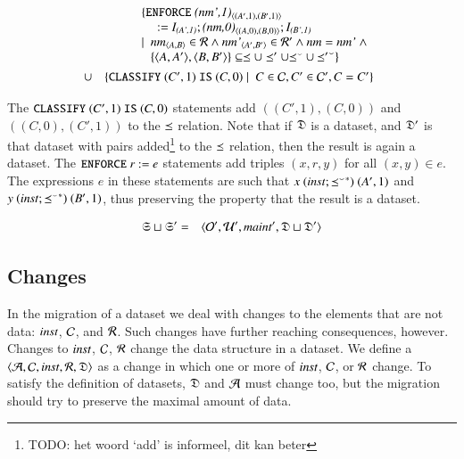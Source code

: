 \documentclass{elsarticle}
\begin{document}
\begin{definition}
   \begin{eqnarray}
      &&\begin{array}[t]{@{}l}
         \{ {\tt ENFORCE\ }\declare{(nm',1)}{(A',1)}{(B',1)}\\\quad{\tt\ :=\ }\ident{(A',1)};\declare{(nm,0)}{(A,0)}{(B,0)};\ident{(B',1)}\\
            \mid\ \begin{array}[t]{@{}l}
               \declare{nm}{A}{B}\in\rels\wedge\declare{nm'}{A'}{B'}\in\rels'\wedge\id{nm}=\id{nm'}\ \wedge\\
               \{\pair{A}{A'},\pair{B}{B'}\}\subseteq\isa\cup\isa'\cup\flip{\isa}\cup\flip{\isa'}\}
               \end{array}
           \end{array}\\
           &\cup&\begin{array}[t]{@{}l}
            \{ {\tt CLASSIFY\ }(C',1){\tt\ IS\ }(C,0)\mid\ C\in\concepts,C'\in\concepts',C=C'\}\\
           \end{array}
   \end{eqnarray}
\end{definition}

The ${\tt CLASSIFY\ }(C',1){\tt\ IS\ }(C,0)$ statements add $((C',1),(C,0))$ and  $((C,0),(C',1))$ to the $\preceq$ relation. Note that if $\mathfrak{D}$ is a dataset, and $\mathfrak{D}'$ is that dataset with pairs added\footnote{TODO: het woord `add' is informeel, dit kan beter} to the $\preceq$ relation, then the result is again a dataset.
The ${\tt ENFORCE\ }r{\tt\ :=\ }e$ statements add triples $(x,r,y)$ for all $(x,y)\in e$.
The expressions $e$ in these statements are such that $x\ (\text{\it inst\/} ; {{\preceq}^\smallsmile}^*)\ (A',1)$ and $y \ (\inst \compose \kleenestar{\flip{\isa}})\ (B',1)$, thus preserving the property that the result is a dataset.

\begin{definition}[]
   \begin{eqnarray}
      \mathfrak{S}\sqcup\mathfrak{S}'&=&\langle\mathcal{O}',\mathcal{U}',\text{\it maint\/}',\mathfrak{D}\sqcup\mathfrak{D}'\rangle
   \end{eqnarray}
\end{definition}

\subsection{Changes}
   In the migration of a dataset we deal with changes to the elements that are not data:
   $\text{\it inst\/}$, $\mathcal{C}$, and $\mathcal{R}$.
   Such changes have further reaching consequences, however.
   Changes to $\text{\it inst\/}$, $\mathcal{C}$, $\mathcal{R}$ change the data structure in a dataset.
   We define a  $\langle\mathcal{A},\mathcal{C},\text{\it inst\/},\mathcal{R},\mathfrak{D}\rangle$ as a change in which one or more of $\text{\it inst\/}$, $\mathcal{C}$, or $\mathcal{R}$ change.
   To satisfy the definition of datasets, $\mathfrak{D}$ and $\mathcal{A}$ must change too,
   but the migration should try to preserve the maximal amount of data.
\end{document}
